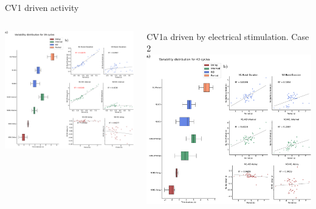 \documentclass[aspectratio=43]{beamer}
\begin{document}
\begin{frame}{CV1 driven activity}
{\begin{columns}
\begin{column}{0.5\textwidth}
				\includegraphics[width=\textwidth]{invariants/data/SUSSEX/CV1a_driven1/images/2phases/panel_with_intervals_boxplot_invariants.pdf}
			\end{column}
			\begin{column}{0.5\textwidth}
				\centering CV1a driven by electrical stimulation. Case 2
				\includegraphics[width=\textwidth]{invariants/data/SUSSEX/CV1a_driven2/images/panel_with_intervals_boxplot_invariants.pdf}
			\end{column}
		\end{columns}
	}
\end{frame}
\end{document}
